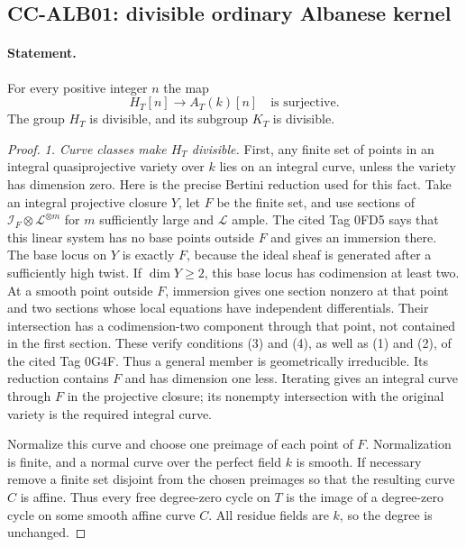 \subsection{CC-ALB01: divisible ordinary Albanese kernel}

\paragraph{Statement.}
For every positive integer $n$ the map
\[
 H_T[n]\longrightarrow A_T(k)[n]
 \quad\text{is surjective}.                         \tag{CC.ALB.1}
\]
The group $H_T$ is divisible, and its subgroup $K_T$ is
divisible.

\begin{proof}
\emph{1. Curve classes make $H_T$ divisible.}
First, any finite set of points in an integral
quasiprojective variety over $k$ lies on an integral
curve, unless the variety has dimension zero.
Here is the precise Bertini reduction used for this fact.
Take an integral projective closure $Y$, let $F$ be the
finite set, and use sections of
$\mathcal I_F\otimes\mathcal L^{\otimes m}$ for $m$
sufficiently large and $\mathcal L$ ample.
The cited Tag 0FD5 says that this linear system has no
base points outside $F$ and gives an immersion there.
The base locus on $Y$ is exactly $F$, because the ideal
sheaf is generated after a sufficiently high twist.
If $\dim Y\geq2$, this base locus has codimension at least
two.  At a smooth point outside $F$, immersion gives one
section nonzero at that point and two sections whose
local equations have independent differentials.
Their intersection has a codimension-two component
through that point, not contained in the first section.
These verify conditions (3) and (4), as well as (1) and
(2), of the cited Tag 0G4F.  Thus a general member is
geometrically irreducible.  Its reduction contains $F$
and has dimension one less.  Iterating gives an
integral curve through $F$ in the projective closure;
its nonempty intersection with the original variety
is the required integral curve.

Normalize this curve and choose one preimage of each
point of $F$.  Normalization is finite, and a normal
curve over the perfect field $k$ is smooth.  If necessary
remove a finite set disjoint from the chosen preimages
so that the resulting curve $C$ is affine.  Thus every
free degree-zero cycle on $T$ is the image of a
degree-zero cycle on some smooth affine curve $C$.
All residue fields are $k$, so the degree is unchanged.


\end{proof}
